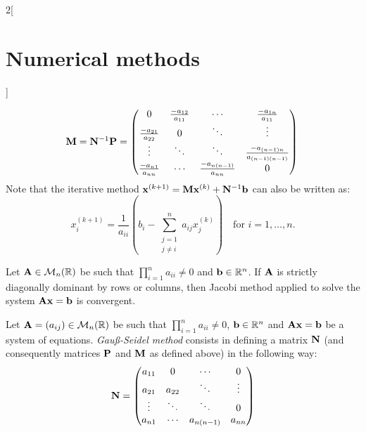 \documentclass[../../../main.tex]{subfiles}
\begin{document}
\begin{multicols}{2}[\section{Numerical methods}]
\begin{definition}
    \begin{equation*}
        \vb{M}=\vb{N}^{-1}\vb{P}=
        \begin{pmatrix}
            0 & \frac{-a_{12}}{a_{11}} & \cdots & \frac{-a_{1n}}{a_{11}}\\
            \frac{-a_{21}}{a_{22}} & 0 & \ddots & \vdots\\
            \vdots & \ddots & \ddots & \frac{-a_{(n-1)n}}{a_{(n-1)(n-1)}}\\
            \frac{-a_{n1}}{a_{nn}} & \cdots & \frac{-a_{n(n-1)}}{a_{nn}} & 0
        \end{pmatrix}\\
    \end{equation*}
    Note that the iterative method $\vb{x}^{(k+1)}=\vb{M}\vb{x}^{(k)}+\vb{N}^{-1}\vb{b}$ can also be written as: $$x_i^{(k+1)}=\frac{1}{a_{ii}}\left(b_i-\sum_{\substack{j=1\\j\ne i}}^na_{ij}x_j^{(k)}\right)\quad\text{for }i=1,\ldots,n.$$
\end{definition}
\begin{theorem}
    Let $\vb{A}\in\mathcal{M}_n(\mathbb{R})$ be such that $\prod_{i=1}^na_{ii}\ne 0$ and $\vb{b}\in\mathbb{R}^n$. If $\vb{A}$ is strictly diagonally dominant by rows or columns, then Jacobi method applied to solve the system $\vb{A}\vb{x}=\vb{b}$ is convergent.
\end{theorem}
\begin{definition}
    Let $\vb{A}=(a_{ij})\in\mathcal{M}_n(\mathbb{R})$ be such that $\prod_{i=1}^na_{ii}\ne 0$, $\vb{b}\in\mathbb{R}^n$ and $\vb{A}\vb{x}=\vb{b}$ be a system of equations. \textit{Gau\ss-Seidel method} consists in defining a matrix $\vb{N}$ (and consequently matrices $\vb{P}$ and $\vb{M}$ as defined above) in the following way:
    \begin{equation*}
        \vb{N}=
        \begin{pmatrix}
            a_{11} & 0 & \cdots & 0\\
            a_{21} & a_{22} & \ddots & \vdots\\
            \vdots & \ddots & \ddots & 0\\
            a_{n1} & \cdots & a_{n(n-1)} & a_{nn}
        \end{pmatrix}
    \end{equation*}
    \begin{equation*}

\end{equation*}
\end{definition}
\end{multicols}
\end{document}
